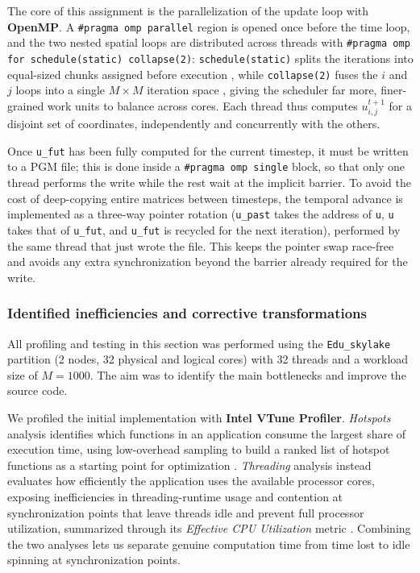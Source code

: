 The core of this assignment is the parallelization of the update loop
with \textbf{OpenMP}. A \texttt{\#pragma omp parallel} region is opened
once before the time loop, and the two nested spatial loops are
distributed across threads with \texttt{\#pragma omp for
schedule(static) collapse(2)}: \texttt{schedule(static)} splits the
iterations into equal-sized chunks assigned before execution \cite{slidestatic}, while
\texttt{collapse(2)} fuses the $i$ and $j$ loops into a single
$M\times M$ iteration space \cite{openmpcollapse}, giving the scheduler far more, finer-grained
work units to balance across cores. Each thread thus computes
$u_{i,j}^{t+1}$ for a disjoint set of coordinates, independently and
concurrently with the others.

Once \texttt{u\_fut} has been fully computed for the current timestep, it
must be written to a PGM file; this is done inside a \texttt{\#pragma omp
single} block, so that only one thread performs the write while the rest
wait at the implicit barrier. To avoid the cost of deep-copying entire
matrices between timesteps, the temporal advance is implemented as a
three-way pointer rotation (\texttt{u\_past} takes the address of
\texttt{u}, \texttt{u} takes that of \texttt{u\_fut}, and \texttt{u\_fut}
is recycled for the next iteration), performed by the same thread that
just wrote the file. This keeps the pointer swap race-free and avoids any
extra synchronization beyond the barrier already required for the write.

\subsubsection{Identified inefficiencies and corrective transformations}
All profiling and testing in this section was performed using the \texttt{Edu\_skylake} partition (2 nodes, 32 physical and logical cores) \cite{hpcguide} with 32 threads
and a workload size of $M = 1000$. The aim was to identify the main bottlenecks and improve the source code.

We profiled the initial implementation with \textbf{Intel VTune
Profiler}. \textit{Hotspots} analysis identifies which functions in an
application consume the largest share of execution time, using
low-overhead sampling to build a ranked list of hotspot functions as a
starting point for optimization \cite{vtune-hotspots}. \textit{Threading}
analysis instead evaluates how efficiently the application uses the
available processor cores, exposing inefficiencies in threading-runtime
usage and contention at synchronization points that leave threads idle
and prevent full processor utilization, summarized through its
\textit{Effective CPU Utilization} metric \cite{vtune-threading}.
Combining the two analyses lets us separate genuine computation time from
time lost to idle spinning at synchronization points.

